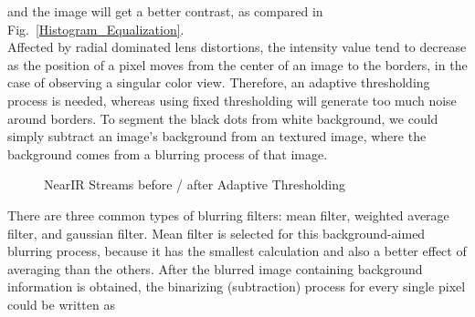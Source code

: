 %
\noindent
and the image will get a better contrast, as compared in Fig.~\ref{Histogram_Equalization}.%
\\\indent%
Affected by radial dominated lens distortions, the intensity value tend to decrease as the position of a pixel moves from the center of an image to the borders, in the case of observing a singular color view. Therefore, an adaptive thresholding process is needed, whereas using fixed thresholding will generate too much noise around borders. To segment the black dots from white background, we could simply subtract an image's background from an textured image, where the background comes from a blurring process of that image.%
%
 \begin{figure}[t]
\hspace*{-0.5cm}
\centering
{}
\caption{NearIR Streams before / after Adaptive Thresholding}
\label{Adaptive_Thresholding}
\end{figure}%
%
There are three common types of blurring filters: mean filter, weighted average filter, and gaussian filter. Mean filter is selected for this background-aimed blurring process, because it has the smallest calculation and also a better effect of averaging than the others. After the blurred image containing background information is obtained, the binarizing (subtraction) process for every single pixel could be written as

